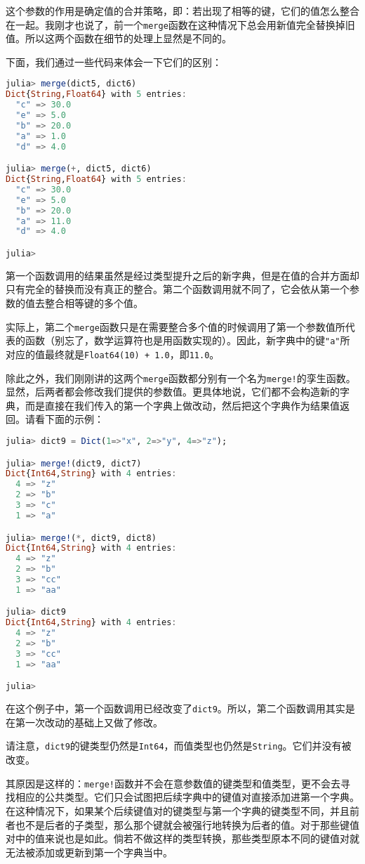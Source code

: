 这个参数的作用是确定值的合并策略，即：若出现了相等的键，它们的值怎么整合在一起。我刚才也说了，前一个\verb|merge|函数在这种情况下总会用新值完全替换掉旧值。所以这两个函数在细节的处理上显然是不同的。

下面，我们通过一些代码来体会一下它们的区别：
\begin{lstlisting}[language=julia]
julia> merge(dict5, dict6)
Dict{String,Float64} with 5 entries:
  "c" => 30.0
  "e" => 5.0
  "b" => 20.0
  "a" => 1.0
  "d" => 4.0

julia> merge(+, dict5, dict6)
Dict{String,Float64} with 5 entries:
  "c" => 30.0
  "e" => 5.0
  "b" => 20.0
  "a" => 11.0
  "d" => 4.0

julia> 
\end{lstlisting}

第一个函数调用的结果虽然是经过类型提升之后的新字典，但是在值的合并方面却只有完全的替换而没有真正的整合。第二个函数调用就不同了，它会依从第一个参数的值去整合相等键的多个值。

实际上，第二个\verb|merge|函数只是在需要整合多个值的时候调用了第一个参数值所代表的函数（别忘了，数学运算符也是用函数实现的）。因此，新字典中的键\verb|"a"|所对应的值最终就是\verb|Float64(10) + 1.0|，即\verb|11.0|。

除此之外，我们刚刚讲的这两个\verb|merge|函数都分别有一个名为\verb|merge!|的孪生函数。显然，后两者都会修改我们提供的参数值。更具体地说，它们都不会构造新的字典，而是直接在我们传入的第一个字典上做改动，然后把这个字典作为结果值返回。请看下面的示例：
\begin{lstlisting}[language=julia]
julia> dict9 = Dict(1=>"x", 2=>"y", 4=>"z");

julia> merge!(dict9, dict7)
Dict{Int64,String} with 4 entries:
  4 => "z"
  2 => "b"
  3 => "c"
  1 => "a"

julia> merge!(*, dict9, dict8)
Dict{Int64,String} with 4 entries:
  4 => "z"
  2 => "b"
  3 => "cc"
  1 => "aa"

julia> dict9
Dict{Int64,String} with 4 entries:
  4 => "z"
  2 => "b"
  3 => "cc"
  1 => "aa"

julia> 
\end{lstlisting}

在这个例子中，第一个函数调用已经改变了\verb|dict9|。所以，第二个函数调用其实是在第一次改动的基础上又做了修改。

请注意，\verb|dict9|的键类型仍然是\verb|Int64|，而值类型也仍然是\verb|String|。它们并没有被改变。

其原因是这样的：\verb|merge!|函数并不会在意参数值的键类型和值类型，更不会去寻找相应的公共类型。它们只会试图把后续字典中的键值对直接添加进第一个字典。在这种情况下，如果某个后续键值对的键类型与第一个字典的键类型不同，并且前者也不是后者的子类型，那么那个键就会被强行地转换为后者的值。对于那些键值对中的值来说也是如此。倘若不做这样的类型转换，那些类型原本不同的键值对就无法被添加或更新到第一个字典当中。

